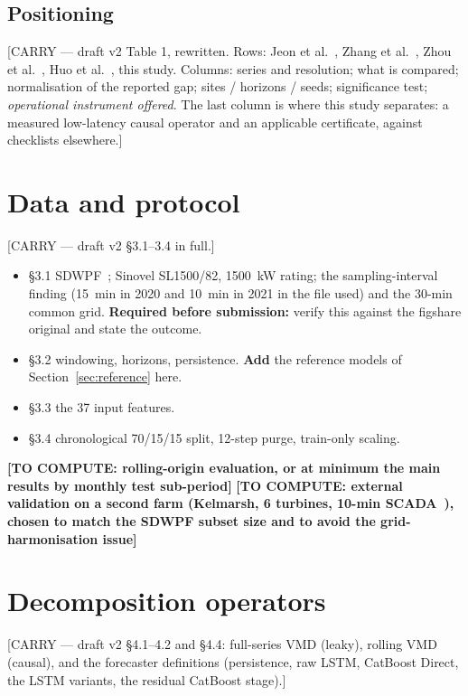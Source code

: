 \documentclass[review,3p,times]{elsarticle}
\newcommand{\todo}[1]{\textbf{[TO COMPUTE: #1]}}
\newcommand{\carry}[1]{\textsf{\small [CARRY --- #1]}}
\begin{document}
\subsection{Positioning}
\carry{draft v2 Table 1, rewritten. Rows: Jeon et al.~\cite{jeon2026},
Zhang et al.~\cite{zhang2025}, Zhou et al.~\cite{zhou2024},
Huo et al.~\cite{huo2024}, this study. Columns: series and resolution;
what is compared; normalisation of the reported gap; sites / horizons / seeds;
significance test; \emph{operational instrument offered}. The last column is
where this study separates: a measured low-latency causal operator and an
applicable certificate, against checklists elsewhere.}

\section{Data and protocol}\label{sec:data}
\carry{draft v2 §3.1--3.4 in full.}
\begin{itemize}
\item \S3.1 SDWPF~\cite{zhou2024sdwpf}; Sinovel SL1500/82, 1500~kW rating; the
sampling-interval finding (15~min in 2020 and 10~min in 2021 in the file used)
and the 30-min common grid. \textbf{Required before submission:} verify this
against the figshare original and state the outcome.
\item \S3.2 windowing, horizons, persistence. \textbf{Add} the reference
models of Section~\ref{sec:reference} here.
\item \S3.3 the 37 input features.
\item \S3.4 chronological 70/15/15 split, 12-step purge, train-only scaling.
\end{itemize}
\todo{rolling-origin evaluation, or at minimum the main results by monthly
test sub-period}
\todo{external validation on a second farm (Kelmarsh, 6 turbines, 10-min
SCADA~\cite{kelmarsh2022}), chosen to match the SDWPF subset size and to avoid
the grid-harmonisation issue}

\section{Decomposition operators}\label{sec:operators}
\carry{draft v2 §4.1--4.2 and §4.4: full-series VMD (leaky), rolling VMD
(causal), and the forecaster definitions (persistence, raw LSTM, CatBoost
Direct, the LSTM variants, the residual CatBoost stage).}
\end{document}
